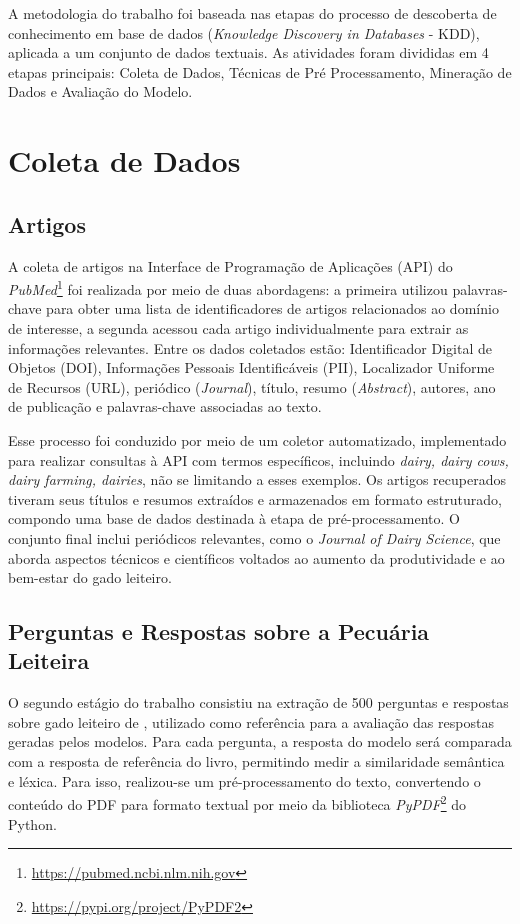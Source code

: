 A metodologia do trabalho foi baseada nas etapas do processo de descoberta de conhecimento em base de dados (\textit{Knowledge Discovery in Databases} - KDD)\cite{KDD}, aplicada a um conjunto de dados textuais. As atividades foram divididas em 4 etapas principais: Coleta de Dados, Técnicas de Pré Processamento, Mineração de Dados e Avaliação do Modelo. 

\section{Coleta de Dados}

\subsection{Artigos}
A coleta de artigos na Interface de Programação de Aplicações (API) do \textit{PubMed}\footnote{\url{https://pubmed.ncbi.nlm.nih.gov}} foi realizada por meio de duas abordagens: a primeira utilizou palavras-chave para obter uma lista de identificadores de artigos relacionados ao domínio de interesse, a segunda acessou cada artigo individualmente para extrair as informações relevantes. Entre os dados coletados estão: Identificador Digital de Objetos (DOI), Informações Pessoais Identificáveis (PII), Localizador Uniforme de Recursos (URL), periódico (\textit{Journal}), título, resumo (\textit{Abstract}), autores, ano de publicação e palavras-chave associadas ao texto.

Esse processo foi conduzido por meio de um coletor automatizado, implementado para realizar consultas à API com termos específicos, incluindo \textit{dairy, dairy cows, dairy farming, dairies}, não se limitando a esses exemplos. Os artigos recuperados tiveram seus títulos e resumos extraídos e armazenados em formato estruturado, compondo uma base de dados destinada à etapa de pré-processamento. O conjunto final inclui periódicos relevantes, como o \textit{Journal of Dairy Science}, que aborda aspectos técnicos e científicos voltados ao aumento da produtividade e ao bem-estar do gado leiteiro.

\subsection{Perguntas e Respostas sobre a Pecuária Leiteira}
O segundo estágio do trabalho consistiu na extração de 500 perguntas e respostas sobre gado leiteiro de , utilizado como referência para a avaliação das respostas geradas pelos modelos. Para cada pergunta, a resposta do modelo será comparada com a resposta de referência do livro, permitindo medir a similaridade semântica e léxica. Para isso, realizou-se um pré-processamento do texto, convertendo o conteúdo do PDF para formato textual por meio da biblioteca \textit{PyPDF}\footnote{\url{https://pypi.org/project/PyPDF2}} do Python.

